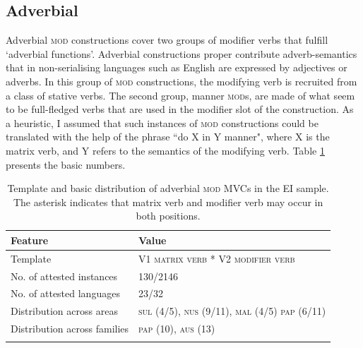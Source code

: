 \subsection{Adverbial}\label{sec:adverbial}

Adverbial \textsc{mod} constructions cover two groups of modifier verbs that fulfill `adverbial functions'. Adverbial constructions proper contribute adverb-semantics that in non-serialising languages such as English are expressed by adjectives or adverbs. In this group of \textsc{mod} constructions, the modifying verb is recruited from a class of stative verbs. The second group, manner \textsc{mod}s, are made of what seem to be full-fledged verbs that are used in the modifier slot of the construction. As a heuristic, I assumed that such instances of \textsc{mod} constructions could be translated with the help of the phrase ``do X in Y manner", where X is the matrix verb, and Y refers to the semantics of the modifying verb. Table \ref{table:adverbial} presents the basic numbers. 

\begin{table}
\begin{tabular}{ll}
\lsptoprule
Feature&Value\tabularnewline
\hline
Template&V1 \textsc{matrix verb} * V2 \textsc{modifier verb}\tabularnewline
No. of attested instances& 130/2146 \tabularnewline
No. of attested languages& 23/32 \tabularnewline
Distribution across areas& \textsc{sul} (4/5), \textsc{nus} (9/11), \textsc{mal} (4/5) \textsc{pap} (6/11) \tabularnewline
Distribution across families& \textsc{pap} (10), \textsc{aus} (13) \tabularnewline
\lspbottomrule
\end{tabular}
\caption[Template and basic distribution of adverbial \textsc{mod} MVCs]{Template and basic distribution of adverbial \textsc{mod} MVCs in the EI sample. The asterisk indicates that matrix verb and modifier verb may occur in both positions.}
\label{table:adverbial}
\end{table}


